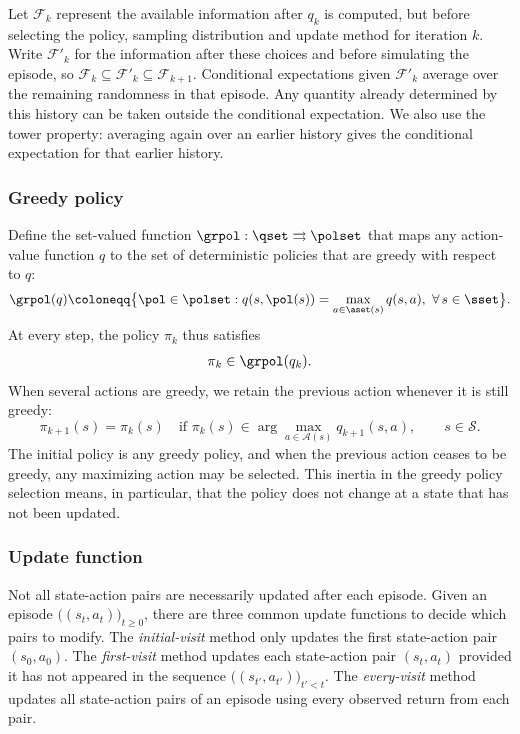 Let $\mathcal F_k$ represent the available information after $q_k$ is computed, but before selecting the policy, sampling distribution and update method for iteration $k$.
Write $\mathcal F'_k$ for the information after these choices and before simulating the episode, so $\mathcal F_k\subseteq\mathcal F'_k\subseteq\mathcal F_{k+1}$.
Conditional expectations given $\mathcal F'_k$ average over the remaining randomness in that episode. Any quantity already determined by this history can be taken outside the conditional expectation. We also use the tower property: averaging again over an earlier history gives the conditional expectation for that earlier history.

\subsubsection{Greedy policy}

Define the set-valued function $\grpol : \qset \rightrightarrows \polset$ that maps any action-value function $q$ to the set of deterministic policies that are greedy with respect to $q$:
\begin{align}
\label{eq: greedy pol}
    \grpol(q) \coloneqq \big\{ \pol \in \polset : q(s, \pol(s)) = \max_{a \in \aset(s)} q(s,a), \ \forall \, s \in \sset \big\} .
\end{align}
At every step, the policy $\pi_k$ thus satisfies 
\begin{align}
\label{eq: greedy policy def}
    \pi_k \in \grpol(q_k) .
\end{align}
When several actions are greedy, we retain the previous action whenever it is still greedy:
\begin{equation}
\label{eq:greedy-pol-tie-breaking}
\pi_{k+1}(s)=\pi_k(s)
\quad\text{if }\pi_k(s)\in\arg\max_{a\in\mathcal A(s)}q_{k+1}(s,a),
\qquad s\in\mathcal S.
\end{equation}
The initial policy is any greedy policy, and when the previous action ceases to be greedy, any maximizing action may be selected.
This inertia in the greedy policy selection means, in particular, that the policy does not change at a state that has not been updated.

\subsubsection{Update function}

Not all state-action pairs are necessarily updated after each episode.
Given an episode $\big( (s_t, a_t) \big)_{t \ge 0}$, there are three common update functions to decide which pairs to modify.
The \textit{initial-visit} method only updates the first state-action pair $(s_0, a_0)$.
The \textit{first-visit} method updates each state-action pair $(s_t, a_t)$ provided it has not appeared in the sequence $\big((s_{t'}, a_{t'})\big)_{t' < t}$.
The \textit{every-visit} method updates all state-action pairs of an episode using every observed return from each pair.

